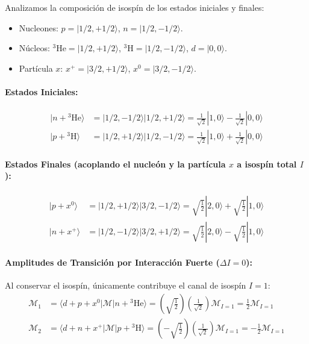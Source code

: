 \begin{problema}
Analizamos la composición de isospín de los estados iniciales y finales:
\begin{itemize}
    \item Nucleones: $p = |1/2, +1/2\rangle$, $n = |1/2, -1/2\rangle$.
    \item Núcleos: ${}^3\text{He} = |1/2, +1/2\rangle$, ${}^3\text{H} = |1/2, -1/2\rangle$, $d = |0, 0\rangle$.
    \item Partícula $x$: $x^+ = |3/2, +1/2\rangle$, $x^0 = |3/2, -1/2\rangle$.
\end{itemize}

\paragraph{Estados Iniciales:}
\begin{align*}
|n + {}^3\text{He}\rangle &= |1/2, -1/2\rangle |1/2, +1/2\rangle = \frac{1}{\sqrt{2}} |1, 0\rangle - \frac{1}{\sqrt{2}} |0, 0\rangle \\
|p + {}^3\text{H}\rangle &= |1/2, +1/2\rangle |1/2, -1/2\rangle = \frac{1}{\sqrt{2}} |1, 0\rangle + \frac{1}{\sqrt{2}} |0, 0\rangle
\end{align*}

\paragraph{Estados Finales (acoplando el nucleón y la partícula $x$ a isospín total $I$):}
\begin{align*}
|p + x^0\rangle &= |1/2, +1/2\rangle |3/2, -1/2\rangle = \sqrt{\frac{1}{2}} |2, 0\rangle + \sqrt{\frac{1}{2}} |1, 0\rangle \\
|n + x^+\rangle &= |1/2, -1/2\rangle |3/2, +1/2\rangle = \sqrt{\frac{1}{2}} |2, 0\rangle - \sqrt{\frac{1}{2}} |1, 0\rangle
\end{align*}

\paragraph{Amplitudes de Transición por Interacción Fuerte ($\Delta I = 0$):}
Al conservar el isospín, únicamente contribuye el canal de isospín $I = 1$:
\begin{align*}
\mathcal{M}_1 &= \langle d + p + x^0 | \mathcal{M} | n + {}^3\text{He} \rangle = \left( \sqrt{\frac{1}{2}} \right) \left( \frac{1}{\sqrt{2}} \right) \mathcal{M}_{I=1} = \frac{1}{2} \mathcal{M}_{I=1} \\
\mathcal{M}_2 &= \langle d + n + x^+ | \mathcal{M} | p + {}^3\text{H} \rangle = \left( -\sqrt{\frac{1}{2}} \right) \left( \frac{1}{\sqrt{2}} \right) \mathcal{M}_{I=1} = -\frac{1}{2} \mathcal{M}_{I=1}
\end{align*}


\end{problema}
